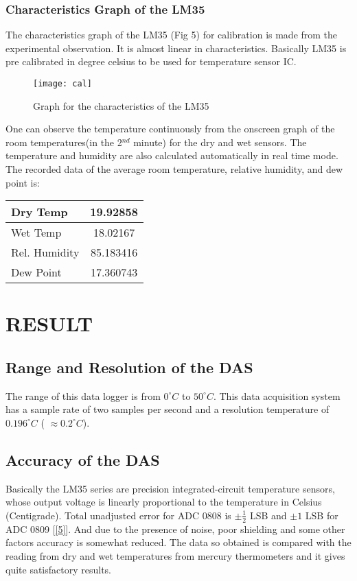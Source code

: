 \documentclass[10pt,a4paper]{article}
\begin{document}
\subsubsection{Characteristics Graph of the LM35}
The characteristics graph of the LM35 (Fig 5) for calibration is made from the experimental observation. It is almost linear in characteristics. Basically LM35 is pre calibrated in degree celsius to be used for temperature sensor IC.
\begin{figure}[!h]
\centering \texttt{[image: cal]}
\caption{Graph for the characteristics of the LM35}
\end{figure}

One can observe the temperature continuously from the onscreen graph of the room temperatures(in the 2$^{nd}$ minute) for the dry and wet sensors. The temperature and humidity are also calculated automatically in real time mode.\\

The recorded data of the average room temperature, relative humidity, and dew point is:\\
\begin{table}[!h]
\centering \begin{tabular}{|l|c|}
\hline
Dry Temp & 19.92858\\
\hline
Wet Temp & 18.02167\\
\hline
Rel. Humidity & 85.183416\\
\hline
Dew Point & 17.360743\\
\hline
\end{tabular}
\end{table}
\section{RESULT}
\subsection{Range and Resolution of the DAS}
The range of this data logger is from $0^{\circ} C$ to $50^{\circ} C$. This data acquisition system has a sample rate of two samples per second and a resolution temperature of $0.196 ^{\circ} C$ ( $\approx 0.2 ^{\circ} C$).
\subsection{Accuracy of the DAS}
Basically the LM35 series are precision integrated-circuit temperature sensors, whose output voltage is linearly proportional to the temperature in Celsius (Centigrade). Total unadjusted error for ADC 0808 is $\pm{\frac{1}{2}}$ LSB and $\pm 1$ LSB for ADC 0809 [\ref{5}]. And due to the presence of noise, poor shielding and some other factors accuracy is somewhat reduced. The data so obtained is compared with the reading from dry and wet temperatures from mercury thermometers and it gives quite satisfactory results.
\end{document}
